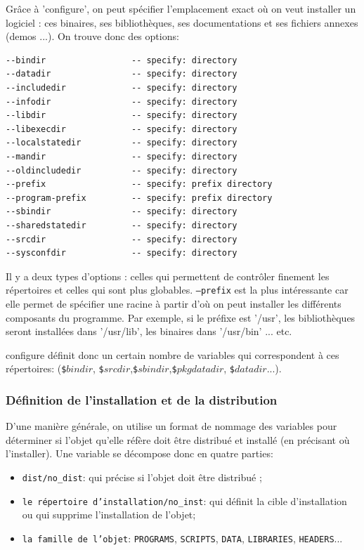 \documentclass[11pt,a4paper]{article}
\newcommand{\bitem}{\item[$\bullet$]}
\begin{document}
Grâce à 'configure', on peut spécifier l'emplacement exact où on veut
installer un logiciel : ces binaires, ses bibliothèques, ses
documentations et ses fichiers annexes (demos ...). On trouve donc des
options:

{\small
\begin{verbatim}
--bindir                 -- specify: directory
--datadir                -- specify: directory
--includedir             -- specify: directory
--infodir                -- specify: directory
--libdir                 -- specify: directory
--libexecdir             -- specify: directory
--localstatedir          -- specify: directory
--mandir                 -- specify: directory
--oldincludedir          -- specify: directory
--prefix                 -- specify: prefix directory
--program-prefix         -- specify: prefix directory
--sbindir                -- specify: directory
--sharedstatedir         -- specify: directory
--srcdir                 -- specify: directory
--sysconfdir             -- specify: directory
\end{verbatim}
}

Il y a deux types d'options : celles qui permettent de contrôler
finement les répertoires et celles qui sont plus
globables. \texttt{--prefix} est la plus intéressante car elle permet
de spécifier une racine à partir d'où on peut installer les différents
composants du programme. Par exemple, si le préfixe est '/usr', les
bibliothèques seront installées dans '/usr/lib', les binaires dans
'/usr/bin' ... etc.

configure définit donc un certain nombre de variables qui
correspondent à ces répertoires: (\texttt{\$\(bindir\)},
\texttt{\$\(srcdir\)},\texttt{\$\(sbindir\)},\texttt{\$\(pkgdatadir\)},
\texttt{\$\(datadir\)}...).

\subsubsection{Définition de l'installation et de la distribution}

D'une manière générale, on utilise un format de nommage des variables
pour déterminer si l'objet qu'elle réfère doit être distribué et
installé (en précisant où l'installer). Une variable se décompose donc
en quatre parties:

\begin{itemize}
\bitem \texttt{dist/no\_dist}: qui précise si l'objet doit être distribué ;
\bitem \texttt{le répertoire d'installation/no\_inst}: qui définit la cible
d'installation ou qui supprime l'installation de l'objet;
\bitem \texttt{la famille de l'objet}: \texttt{PROGRAMS},
\texttt{SCRIPTS}, \texttt{DATA}, \texttt{LIBRARIES}, \texttt{HEAD\-ERS}...
\end{itemize}
\end{document}

